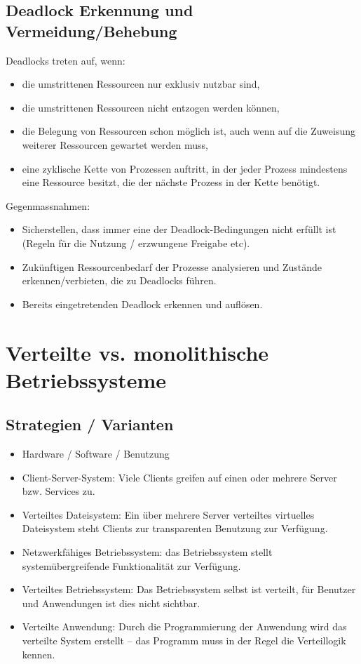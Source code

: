 \documentclass[a4paper, 10pt]{article}
\begin{document}
\subsection{Deadlock Erkennung und Vermeidung/Behebung}
Deadlocks treten auf, wenn:
\begin{itemize}
	\item die umstrittenen Ressourcen nur exklusiv nutzbar sind,
	\item die umstrittenen Ressourcen nicht entzogen werden können,
	\item die Belegung von Ressourcen schon möglich ist, auch wenn auf die Zuweisung weiterer Ressourcen gewartet werden muss,
	\item eine zyklische Kette von Prozessen auftritt, in der jeder Prozess mindestens eine Ressource besitzt, die der n\"achste Prozess in der Kette benötigt.
\end{itemize}
Gegenmassnahmen:
\begin{itemize}
	\item Sicherstellen, dass immer eine der Deadlock-Bedingungen nicht erf\"ullt ist (Regeln f\"ur die Nutzung / erzwungene Freigabe etc).
	\item Zuk\"unftigen Ressourcenbedarf der Prozesse analysieren und Zust\"ande erkennen/verbieten, die zu Deadlocks f\"uhren.
	\item Bereits eingetretenden Deadlock erkennen und auflösen.
\end{itemize}


\newpage
\section{Verteilte vs. monolithische Betriebssysteme}
\subsection{Strategien / Varianten}
\begin{itemize}
	\item Hardware / Software / Benutzung
	\item Client-Server-System: Viele Clients greifen auf einen oder mehrere Server bzw. Services zu.
	\item Verteiltes Dateisystem: Ein \"uber mehrere Server verteiltes virtuelles Dateisystem steht Clients zur transparenten Benutzung zur Verf\"ugung.
	\item Netzwerkf\"ahiges Betriebssystem: das Betriebssystem stellt system\"ubergreifende Funktionalit\"at zur Verf\"ugung.
	\item Verteiltes Betriebssystem: Das Betriebssystem selbst ist verteilt, f\"ur Benutzer und Anwendungen ist dies nicht sichtbar.
	\item Verteilte Anwendung: Durch die Programmierung der Anwendung wird das verteilte System erstellt – das Programm muss in der Regel die Verteillogik kennen.
\end{itemize}
\end{document}
